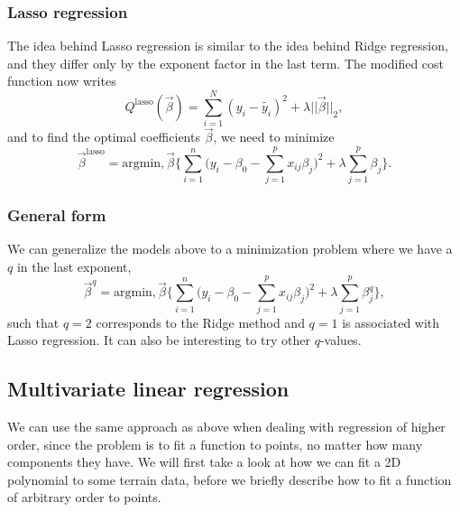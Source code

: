 \subsubsection{Lasso regression} \label{sec:lasso}
The idea behind Lasso regression is similar to the idea behind Ridge regression, and they differ only by the exponent factor in the last term. The modified cost function now writes
\begin{equation}
Q^{\text{lasso}}(\vec{\beta})=\sum_{i=1}^N(y_i-\tilde{y_i})^2+\lambda||\vec{\beta}||_2,
\end{equation}
and to find the optimal coefficients $\vec{\beta}$, we need to minimize
\begin{equation}
\vec{\beta}^{\text{lasso}}=\text{argmin},\vec{\beta}\bigg\{\sum_{i=1}^{n}\Big(y_i-\beta_0-\sum_{j=1}^px_{ij}\beta_j\Big)^2+\lambda\sum_{j=1}^p\beta_j\bigg\}.
\end{equation}

\subsubsection{General form} \label{sec:general}
We can generalize the models above to a minimization problem where we have a $q$ in the last exponent, 
\begin{equation}
\vec{\beta}^q=\text{argmin},\vec{\beta}\bigg\{\sum_{i=1}^{n}\Big(y_i-\beta_0-\sum_{j=1}^px_{ij}\beta_j\Big)^2+\lambda\sum_{j=1}^p\beta_j^q\bigg\},
\end{equation}
such that $q=2$ corresponds to the Ridge method and $q=1$ is associated with Lasso regression. It can also be interesting to try other $q$-values.

\subsection{Multivariate linear regression} \label{sec:higher_reg}
We can use the same approach as above when dealing with regression of higher order, since the problem is to fit a function to points, no matter how many components they have. We will first take a look at how we can fit a 2D polynomial to some terrain data, before we briefly describe how to fit a function of arbitrary order to points.

